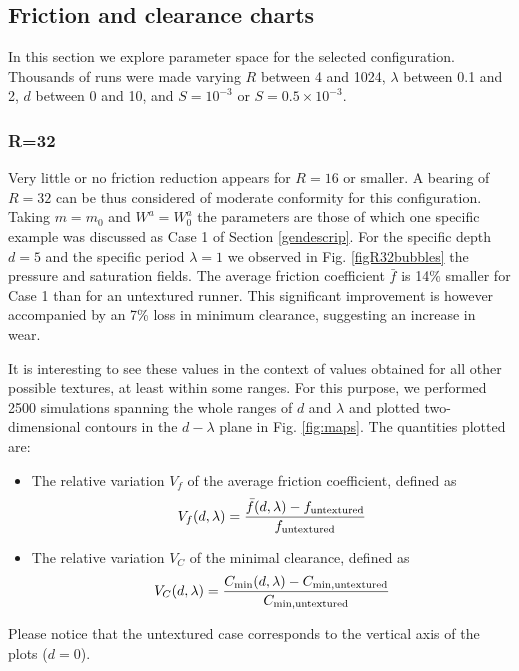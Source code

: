 \subsection{Friction and clearance charts}

In this section we explore parameter space for the selected configuration.
Thousands of runs were made varying $R$ between 4 and 1024,
$\lambda$ between 0.1 and 2, $d$ between 0 and 10, 
and $S=10^{-3}$ or $S=0.5\times 10^{-3}$.

\subsubsection{R=32}

Very little or no friction reduction appears for $R=16$ or smaller.
A bearing of $R=32$ can be thus considered of moderate conformity
for this configuration. Taking $m=m_0$ and $W^a=W^a_0$ the parameters
are those of which one specific example was discussed as Case 1
of Section \ref{gendescrip}. For the specific depth $d=5$ and
the specific period $\lambda=1$ we observed in Fig. 
\ref{figR32bubbles} the pressure and saturation fields. The average friction
coefficient $\bar{f}$ is 14\% smaller for Case 1 than for an %
untextured runner. This significant improvement is however
accompanied by an 7\% loss in minimum clearance, suggesting %
an increase in wear.

It is interesting to see these values in the context of values
obtained for all other possible textures, at least within some
ranges. For this purpose, we performed 2500 simulations spanning
the whole ranges of $d$ and $\lambda$ and plotted two-dimensional
contours in the $d-\lambda$ plane in Fig. \ref{fig:maps}. The quantities plotted are:
\begin{itemize}
\item The relative variation $V_f$ of the average friction coefficient,
defined as
$$
V_f(d,\lambda) = \frac{\bar{f}(d,\lambda)-f_{\mbox{\scriptsize{untextured}}}}
{f_{\mbox{\scriptsize{untextured}}}}
$$
\item The relative variation $V_C$ of the minimal clearance,
defined as
$$
V_C(d,\lambda) = \frac{C_{\min}(d,\lambda)-C_{\min,\mbox{\scriptsize{untextured}}}}
{C_{\min,\mbox{\scriptsize{untextured}}}}
$$
\end{itemize}
Please notice that the untextured case corresponds to the vertical
axis of the plots ($d=0$). 

